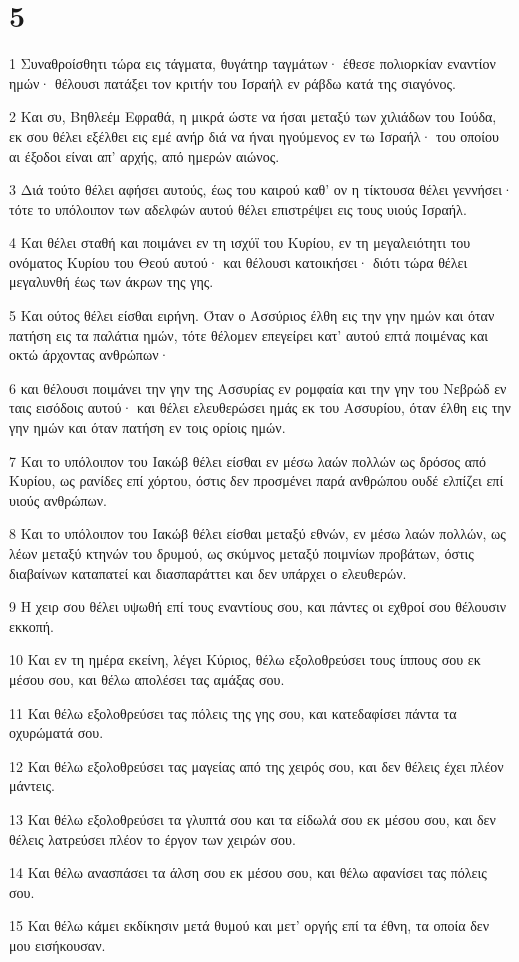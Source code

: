 \chapter{5}

\par 1 Συναθροίσθητι τώρα εις τάγματα, θυγάτηρ ταγμάτων· έθεσε πολιορκίαν εναντίον ημών· θέλουσι πατάξει τον κριτήν του Ισραήλ εν ράβδω κατά της σιαγόνος.
\par 2 Και συ, Βηθλεέμ Εφραθά, η μικρά ώστε να ήσαι μεταξύ των χιλιάδων του Ιούδα, εκ σου θέλει εξέλθει εις εμέ ανήρ διά να ήναι ηγούμενος εν τω Ισραήλ· του οποίου αι έξοδοι είναι απ' αρχής, από ημερών αιώνος.
\par 3 Διά τούτο θέλει αφήσει αυτούς, έως του καιρού καθ' ον η τίκτουσα θέλει γεννήσει· τότε το υπόλοιπον των αδελφών αυτού θέλει επιστρέψει εις τους υιούς Ισραήλ.
\par 4 Και θέλει σταθή και ποιμάνει εν τη ισχύϊ του Κυρίου, εν τη μεγαλειότητι του ονόματος Κυρίου του Θεού αυτού· και θέλουσι κατοικήσει· διότι τώρα θέλει μεγαλυνθή έως των άκρων της γης.
\par 5 Και ούτος θέλει είσθαι ειρήνη. Όταν ο Ασσύριος έλθη εις την γην ημών και όταν πατήση εις τα παλάτια ημών, τότε θέλομεν επεγείρει κατ' αυτού επτά ποιμένας και οκτώ άρχοντας ανθρώπων·
\par 6 και θέλουσι ποιμάνει την γην της Ασσυρίας εν ρομφαία και την γην του Νεβρώδ εν ταις εισόδοις αυτού· και θέλει ελευθερώσει ημάς εκ του Ασσυρίου, όταν έλθη εις την γην ημών και όταν πατήση εν τοις ορίοις ημών.
\par 7 Και το υπόλοιπον του Ιακώβ θέλει είσθαι εν μέσω λαών πολλών ως δρόσος από Κυρίου, ως ρανίδες επί χόρτου, όστις δεν προσμένει παρά ανθρώπου ουδέ ελπίζει επί υιούς ανθρώπων.
\par 8 Και το υπόλοιπον του Ιακώβ θέλει είσθαι μεταξύ εθνών, εν μέσω λαών πολλών, ως λέων μεταξύ κτηνών του δρυμού, ως σκύμνος μεταξύ ποιμνίων προβάτων, όστις διαβαίνων καταπατεί και διασπαράττει και δεν υπάρχει ο ελευθερών.
\par 9 Η χειρ σου θέλει υψωθή επί τους εναντίους σου, και πάντες οι εχθροί σου θέλουσιν εκκοπή.
\par 10 Και εν τη ημέρα εκείνη, λέγει Κύριος, θέλω εξολοθρεύσει τους ίππους σου εκ μέσου σου, και θέλω απολέσει τας αμάξας σου.
\par 11 Και θέλω εξολοθρεύσει τας πόλεις της γης σου, και κατεδαφίσει πάντα τα οχυρώματά σου.
\par 12 Και θέλω εξολοθρεύσει τας μαγείας από της χειρός σου, και δεν θέλεις έχει πλέον μάντεις.
\par 13 Και θέλω εξολοθρεύσει τα γλυπτά σου και τα είδωλά σου εκ μέσου σου, και δεν θέλεις λατρεύσει πλέον το έργον των χειρών σου.
\par 14 Και θέλω ανασπάσει τα άλση σου εκ μέσου σου, και θέλω αφανίσει τας πόλεις σου.
\par 15 Και θέλω κάμει εκδίκησιν μετά θυμού και μετ' οργής επί τα έθνη, τα οποία δεν μου εισήκουσαν.

